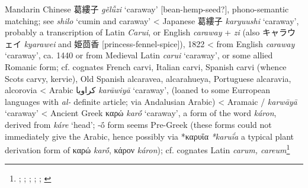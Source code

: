 \begin{etymology}\label{ety:geluzi}
Mandarin Chinese {葛縷子} \textit{gě​lǚ​zi} `caraway' [bean-hemp-seed?], phono-semantic matching; see \textit{shilo} `cumin and caraway'
< Japanese {葛縷子} \textit{karyuushi} `caraway', probably a transcription of Latin \textit{Carui}, or English \textit{caraway} + \textit{zi} (also キャラウェイ \textit{kyarawei} and 姫茴香 [princess-fennel-spice]), 1822
< from English \textit{caraway} `caraway', ca. 1440
 or from Medieval Latin \textit{carui} `caraway', or some allied Romanic form; cf. cognates French carvi, Italian carvi, Spanish carvi (whence Scots carvy, kervie), Old Spanish alcaravea, alcarahueya, Portuguese alcaravia, alcorovia
< Arabic {كراويا} \textit{karāwiyā} `caraway', (loaned to some Eurropean languages with \textit{al-} definite article; via Andalusian Arabic)
< Aramaic {/} \textit{karwāyā} `caraway'
< Ancient Greek {καρώ} \textit{karṓ} `caraway', a form of the word \textit{káron}, derived from \textit{káre} `head'; -ṓ form seems Pre-Greek (these forms could not immediately give the Arabic, hence possibly via *καρυΐα \textit{*karuḯa} a typical plant derivation form of καρώ \textit{karṓ}, κάρον \textit{káron}); cf. cognates Latin \textit{carum, careum}\footnote{\textcite[100]{kleeman_oxford_2010}; \textcite[caraway]{oed}; \textcite[caraway]{ahd}; \textcite[74]{corriente_dictionary_2008}; \textcites[207]{low_aramaeische_1881}[437-438]{low_flora_1924}; \textcites[653]{beekes_etymological_2010}[599]{sokoloff_dictionary_2002}}
\end{etymology}